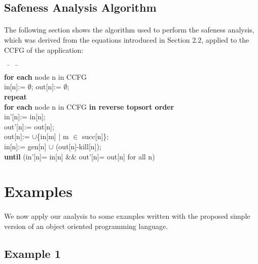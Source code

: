 \documentclass[letterpaper,twocolumn,10pt]{article}
\begin{document}
\subsection{Safeness Analysis Algorithm}
\paragraph{}
The following section shows the algorithm used to perform the safeness analysis, which was derived from the equations introduced in Section 2.2, applied to the CCFG of the application:
\begin{tabbing}
~ \hspace{0.2cm} \= ~ \hspace{0.4cm} \= ~ \hspace{0.6cm} \= \\
\textbf{for each} node n in CCFG\\
\> in[n]:= $\emptyset$; out[n]:= $\emptyset$;\\
\textbf{repeat}\\
\> \textbf{for each} node n in CCFG \textbf{in reverse topsort order}\\
\>\> in'[n]:= in[n]; \\
\>\> out'[n]:= out[n]; \\
\>\> out[n]:= $\cup$\{in[m] | m $\in$ succ[n]\};\\
\>\> in[n]:= gen[n] $\cup$ (out[n]-kill[n]);\\
\textbf{until} (in'[n]= in[n] \&\& out'[n]= out[n] for all n)
\end{tabbing}    
        




\vfill
\break

\section{Examples}
\paragraph{}
We now apply our analysis to some examples written with the proposed simple version of an object oriented programming language.

\subsection{Example 1}
\end{document}

